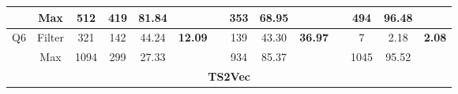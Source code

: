 \begin{table}
\begin{tabular}{cccccccccccccc}
                                & Max                                 & 512                             & 419                                                                     & 81.84                                                                      &                                 &           & 353                                                                     & 68.95                                                                      &                                 &           & 494                                                                     & 96.48                                                                      &                                 \\ \hline
\multirow{2}{*}{Q6}             & Filter                              & 321                             & 142                                                                     & 44.24                                                                      & \multirow{2}{*}{\textbf{12.09}} &           & 139                                                                     & 43.30                                                                      & \multirow{2}{*}{\textbf{36.97}} &           & 7                                                                       & 2.18                                                                       & \multirow{2}{*}{\textbf{2.08}}  \\
                                & Max                                 & 1094                            & 299                                                                     & 27.33                                                                      &                                 &           & 934                                                                     & 85.37                                                                      &                                 &           & 1045                                                                    & 95.52                                                                      &                                 \\ \hline
\multicolumn{14}{c}{\textbf{TS2Vec}}                                                                                                                                                                                                                                                                                                                                                                                                                                                                                                                                                                                                                                                                       \\ \hline

\end{tabular}
\end{table}
